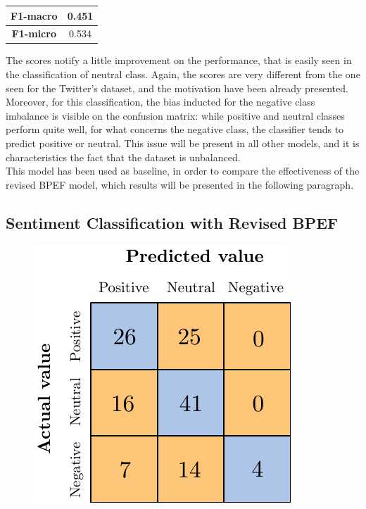 \begin{center}
	\begin{tabular}{ | c | c | } 
		\hline
		\textbf{F1-macro} & 0.451 \\
		\hline
		\textbf{F1-micro} & 0.534 \\ 
		\hline
	\end{tabular}
\end{center}

The scores notify a little improvement on the performance, that is easily seen in the classification of neutral class. Again, the scores are very different from the one seen for the Twitter's dataset, and the motivation have been already presented. Moreover, for this classification, the bias inducted for the negative class imbalance is visible on the confusion matrix: while positive and neutral classes perform quite well, for what concerns the negative class, the classifier tends to predict positive or neutral. This issue will be present in all other models, and it is characteristics the fact that the dataset is unbalanced.\\
This model has been used as baseline, in order to compare the effectiveness of the revised BPEF model, which results will be presented in the following paragraph.

\subsection{Sentiment Classification with Revised BPEF}

\begin{figure}[H]
	\centering
	\includegraphics[scale=1]{figures/conf_matrices/ita_snt_bpef/ita_snt_bpef_bfs.pdf}
	\label{fig:ita_snt_bpef_bfs}
\end{figure}

